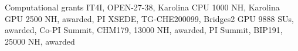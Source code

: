 \begin{rubric}{Computational grants}
%
\entry*[\hspace{1.05cm}2023]%
  IT4I, OPEN-27-38, Karolina CPU 1000 NH, Karolina GPU 2500 NH, awarded, PI
\entry*[2021]%
  XSEDE, TG-CHE200099, Bridges2 GPU 9888 SUs, awarded, Co-PI
\entry*[2020]%
  Summit, CHM179, 13000 NH, awarded, PI
\entry*[2019]%
  Summit, BIP191, 25000 NH, awarded 
\end{rubric}